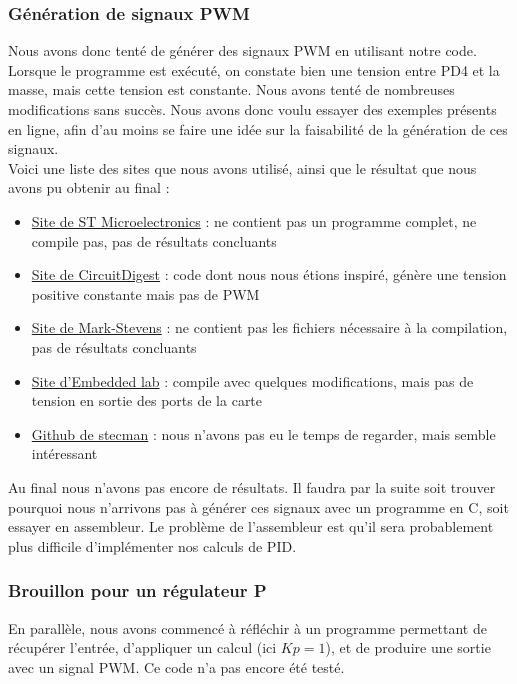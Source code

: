 \documentclass[11pt,a4paper]{article}
\begin{document}
\subsubsection{Génération de signaux PWM}
Nous avons donc tenté de générer des signaux PWM en utilisant notre code. Lorsque le programme est exécuté, on constate bien une tension entre PD4 et la masse, mais cette tension est constante. Nous avons tenté de nombreuses modifications sans succès. Nous avons donc voulu essayer des exemples présents en ligne, afin d'au moins se faire une idée sur la faisabilité de la génération de ces signaux.\\
\medskip
Voici une liste des sites que nous avons utilisé, ainsi que le résultat que nous avons pu obtenir au final :
\begin{itemize}
\item \href{https://www.st.com/en/embedded-software/stsw-stm8036.html}{Site de ST Microelectronics} : ne contient pas un programme complet, ne compile pas, pas de résultats concluants
\item \href{https://circuitdigest.com/microcontroller-projects/pulse-width-modulation-pwm-with-stm8-using-cosmic-c-and-stvd}{Site de CircuitDigest} : code dont nous nous étions inspiré, génère une tension positive constante mais pas de PWM
\item \href{https://blog.mark-stevens.co.uk/2012/08/generating-pwm-signals-using-the-stm8s/}{Site de Mark-Stevens} : ne contient pas les fichiers nécessaire à la compilation, pas de résultats concluants
\item \href{https://embedded-lab.com/blog/starting-stm8-microcontrollers/20/}{Site d'Embedded lab} : compile avec quelques modifications, mais pas de tension en sortie des ports de la carte
\item \href{https://gist.github.com/stecman/f748abea0332be1e41640fd25b5ca861}{Github de stecman} : nous n'avons pas eu le temps de regarder, mais semble intéressant
\end{itemize}
Au final nous n'avons pas encore de résultats. Il faudra par la suite soit trouver pourquoi nous n'arrivons pas à générer ces signaux avec un programme en C, soit essayer en assembleur. Le problème de l'assembleur est qu'il sera probablement plus difficile d'implémenter nos calculs de PID.

\subsubsection{Brouillon pour un régulateur P}
En parallèle, nous avons commencé à réfléchir à un programme permettant de récupérer l'entrée, d'appliquer un calcul (ici $Kp=1$), et de produire une sortie avec un signal PWM. Ce code n'a pas encore été testé.
\end{document}
